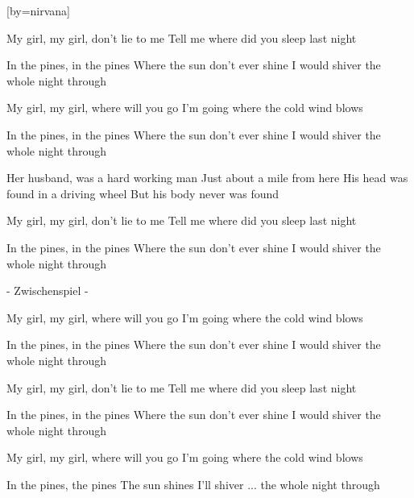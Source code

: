  

[by=nirvana]




\beginverse
My girl, my girl, don't lie to me
Tell me where did you sleep last night
\endverse

\beginchorus
In the pines, in the pines
Where the sun don't ever shine
I would shiver the whole night through
\endchorus

\beginverse
My girl, my girl, where will you go
I'm going where the cold wind blows
\endverse

\beginchorus
In the pines, in the pines
Where the sun don't ever shine
I would shiver the whole night through
\endchorus

\beginverse
Her husband, was a hard working man
Just about a mile from here
His head was found in a driving wheel
But his body never was found
\endverse

\beginverse
My girl, my girl, don't lie to me
Tell me where did you sleep last night
\endverse

\beginchorus
In the pines, in the pines
Where the sun don't ever shine
I would shiver the whole night through
\endchorus

\beginverse
- Zwischenspiel -
\endverse

\beginverse
My girl, my girl, where will you go
I'm going where the cold wind blows
\endverse

\beginchorus
In the pines, in the pines
Where the sun don't ever shine
I would shiver the whole night through
\endchorus

\beginverse
My girl, my girl, don't lie to me
Tell me where did you sleep last night
\endverse

\beginchorus
In the pines, in the pines
Where the sun don't ever shine
I would shiver the whole night through
\endchorus

\beginverse
My girl, my girl, where will you go
I'm going where the cold wind blows
\endverse

\beginchorus
In the pines, the pines
The sun shines
I'll shiver ... the whole night through 
\endchorus

\endsong
